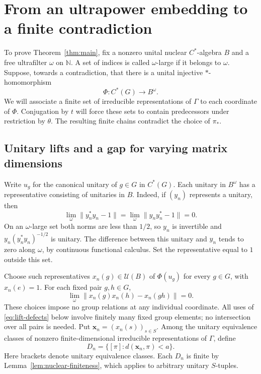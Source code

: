 \section{From an ultrapower embedding to a finite contradiction}
\label{sec:ultrapower-contradiction}
\label{sec:contradiction}

To prove Theorem~\ref{thm:main}, fix a nonzero unital nuclear
$C^*$-algebra $B$ and a free
ultrafilter $\omega$ on $\mathbb N$. A set of indices is called
$\omega$-large if it belongs to $\omega$.
Suppose, towards a contradiction,
that there is a unital injective $*$-homomorphism
\[
 \Phi:C^*(G)\longrightarrow B^\omega.
\]
We will associate a finite set of irreducible representations of
$\Gamma$ to each coordinate of $\Phi$.  Conjugation by $t$ will force
these sets to contain predecessors under restriction by $\theta$.
The resulting finite chains contradict the choice of $\pi_*$.

\subsection{Unitary lifts and a gap for varying matrix dimensions}

Write $u_g$ for the canonical unitary of $g\in G$ in $C^*(G)$.
Each unitary in $B^\omega$ has a representative consisting of unitaries
in $B$.  Indeed, if $(y_n)$ represents a unitary, then
\[
 \lim_\omega\|y_n^*y_n-1\|
 =\lim_\omega\|y_ny_n^*-1\|=0.
\]
On an $\omega$-large set both norms are less than $1/2$, so $y_n$ is
invertible and $y_n(y_n^*y_n)^{-1/2}$ is unitary.  The difference between
this unitary and $y_n$ tends to zero along $\omega$, by continuous
functional calculus.  Set the representative equal to $1$ outside this
set.

Choose such representatives $x_n(g)\in\mathcal U(B)$ of $\Phi(u_g)$
for every $g\in G$, with $x_n(e)=1$.  For each fixed pair $g,h\in G$,
\begin{equation}
 \lim_\omega\|x_n(g)x_n(h)-x_n(gh)\|=0.
 \label{eq:lift-defects}
\end{equation}
These choices impose no group relations at any individual coordinate.
All uses of \eqref{eq:lift-defects} below involve finitely many fixed
group elements; no intersection over all pairs is needed.
Put $\mathbf x_n=(x_n(s))_{s\in S}$.  Among the unitary equivalence
classes of nonzero finite-dimensional irreducible representations
of $\Gamma$, define
\begin{equation}
 D_n=\{[\pi]:d(\mathbf x_n,\pi)<a\}.
 \label{eq:coordinate-D}
\end{equation}
Here brackets denote unitary equivalence classes.  Each $D_n$ is finite
by Lemma~\ref{lem:nuclear-finiteness}, which applies to arbitrary unitary
$S$-tuples.

